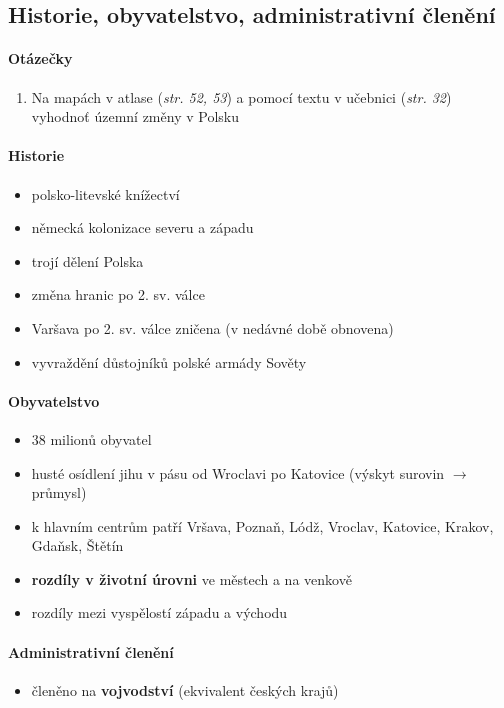 \subsection{Historie, obyvatelstvo, administrativní členění}
\paragraph{Otázečky}
\begin{enumerate}
\item Na mapách v atlase (\textit{str. 52, 53}) a pomocí textu v učebnici (\textit{str. 32}) vyhodnoť územní změny v Polsku
\end{enumerate}

\paragraph{Historie}
\begin{itemize}
\item polsko-litevské knížectví
\item německá kolonizace severu a západu
\item trojí dělení Polska
\item změna hranic po 2. sv. válce
\item Varšava po 2. sv. válce zničena (v nedávné době obnovena)
\item vyvraždění důstojníků polské armády Sověty
\end{itemize}

\paragraph{Obyvatelstvo}
\begin{itemize}
\item 38 milionů obyvatel
\item husté osídlení jihu v pásu od Wroclavi po Katovice (výskyt surovin $\rightarrow$ průmysl)
\item k hlavním centrům patří Vršava, Poznaň, Lódž, Vroclav, Katovice, Krakov, Gdaňsk, Štětín
\item \textbf{rozdíly v životní úrovni} ve městech a na venkově
\item rozdíly mezi vyspělostí západu a východu
\end{itemize}

\paragraph{Administrativní členění}
\begin{itemize}
\item členěno na \textbf{vojvodství} (ekvivalent českých krajů)
\end{itemize}

